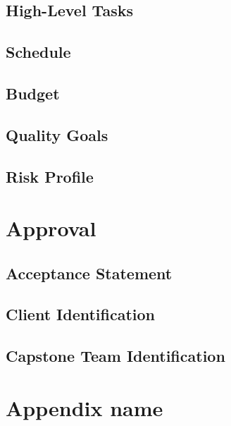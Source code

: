 \documentclass[10pt,letterpaper]{article}
\begin{document}
\subsection{High-Level Tasks}
\subsection{Schedule}
\subsection{Budget}
\subsection{Quality Goals}
\subsection{Risk Profile}

\section{Approval}
\subsection{Acceptance Statement}
\subsection{Client Identification}
\subsection{Capstone Team Identification}


\clearpage
{}



\clearpage
\appendix
\section{Appendix name}\label{appendix:sample-appendix}
\end{document}
